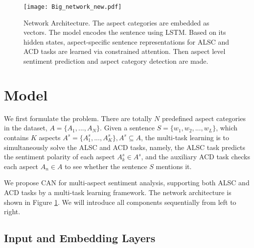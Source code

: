 
\begin{figure*}
\setlength{\abovecaptionskip}{0.2cm}   %
\setlength{\belowcaptionskip}{-0.3cm}   %
\centering
	\texttt{[image: Big\_network\_new.pdf]}
    \caption{Network Architecture. The aspect categories are embedded as vectors. The model encodes the sentence using LSTM. Based on its hidden states, aspect-specific sentence representations for ALSC and ACD tasks are learned via constrained attention. Then aspect level sentiment prediction and aspect category detection are made. }
    \label{network}
\end{figure*}
\section{Model}
We first formulate the problem. There are totally $N$ predefined aspect categories in the dataset, $A=\{A_1,...,A_N\}$. Given a sentence $S=\{w_1, w_2, ..., w_L\}$, which contains $K$ aspects $A^s=\{A_1^s,...,A_K^s\}, A^s\subseteq  A$, the multi-task learning is to simultaneously solve the ALSC and ACD tasks, namely, the ALSC task predicts the sentiment polarity of each aspect $A_k^s \in A^s$, and the auxiliary ACD task checks each aspect $A_n \in A$ to see whether the sentence $S$ mentions it.

We propose CAN for multi-aspect sentiment analysis, supporting both ALSC and ACD tasks by a multi-task learning framework. The network architecture is shown in Figure \ref{network}. We will introduce all components sequentially from left to right.

\subsection{Input and Embedding Layers}